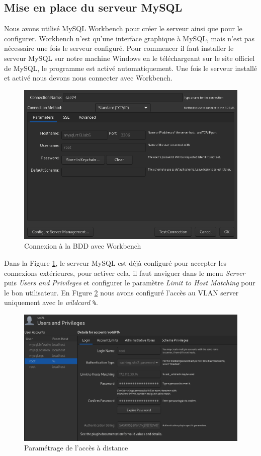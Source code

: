 \documentclass{article}
\begin{document}
\subsection{Mise en place du serveur MySQL}
Nous avons utilisé MySQL Workbench pour créer le serveur ainsi que pour le configurer.
Workbench n'est qu'une interface graphique à MySQL, mais n'est pas nécessaire une fois le serveur configuré.
Pour commencer il faut installer le serveur MySQL sur notre machine Windows en le téléchargeant sur le site officiel de MySQL, le programme est activé automatiquement.
Une fois le serveur installé et activé nous devons nous connecter avec Workbench.
\begin{figure}[H]
    \begin{center}
        \includegraphics[width=0.7\linewidth]{fig/workbench-conn.png}
    \end{center}
    \caption{Connexion à la BDD avec Workbench}
    \label{workbench:conn}
\end{figure}
Dans la Figure \ref{workbench:conn}, le serveur MySQL est déjà configuré pour accepter les connexions extérieures, pour activer cela, il faut naviguer dans le menu \emph{Server} puis \emph{Users and Privileges} et configurer le paramètre \emph{Limit to Host Matching} pour le bon utilisateur. En Figure \ref{workbench:ip-matching} nous avons configuré l'accès au VLAN server uniquement avec le \emph{wildcard} \verb|%|.
\begin{figure}[H]
    \begin{center}
        \includegraphics[width=0.7\linewidth]{fig/workbench-allow-ip.png}
    \end{center}
    \caption{Paramétrage de l'accès à distance}
    \label{workbench:ip-matching}
\end{figure}
\end{document}
